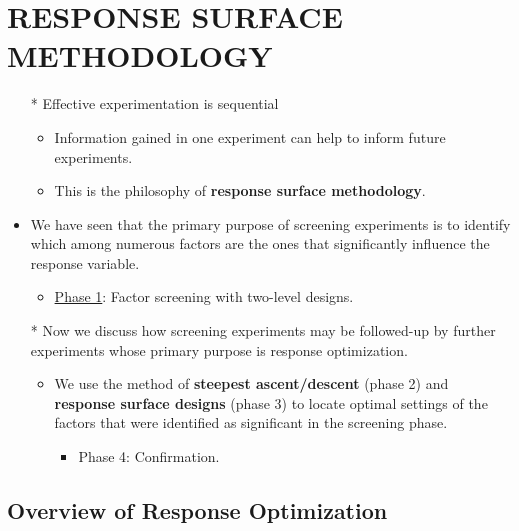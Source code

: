 \chapter{RESPONSE SURFACE METHODOLOGY}
\begin{itemize}
      \item[*] Effective experimentation is sequential
            \begin{itemize}
                  \item Information gained in one experiment can help to inform future experiments.
                  \item This is the philosophy of \textbf{response surface methodology}.
            \end{itemize}
      \item We have seen that the primary purpose of screening experiments is to identify which among numerous
            factors are the ones that significantly influence the response variable.
            \begin{itemize}[$\hookrightarrow$]
                  \item \underline{Phase 1}: Factor screening with two-level designs.
            \end{itemize}
      \item[*] Now we discuss how screening experiments may be followed-up by further experiments whose primary
            purpose is response optimization.
            \begin{itemize}[$\hookrightarrow$]
                  \item We use the method of \textbf{steepest ascent/descent} (phase 2) and \textbf{response surface designs} (phase 3) to locate
                        optimal settings of the factors that were identified as significant in the screening phase.
                        \begin{itemize}
                              \item Phase 4: Confirmation.
                        \end{itemize}
            \end{itemize}
\end{itemize}
\section{Overview of Response Optimization}
